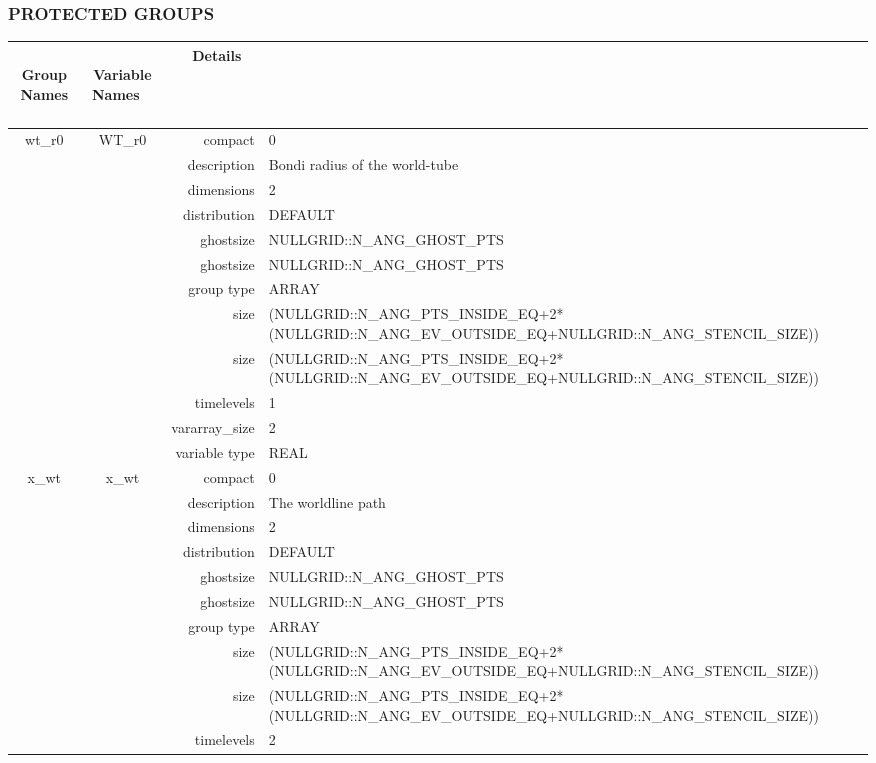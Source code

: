 \vspace{5mm}\subsubsection{PROTECTED GROUPS}

\vspace{5mm}

\begin{tabular*}{150mm}{|c|c@{\extracolsep{\fill}}|rl|} \hline 
~ {\bf Group Names} ~ & ~ {\bf Variable Names} ~  &{\bf Details} ~ & ~\\ 
\hline 
wt\_r0 & WT\_r0 & compact & 0 \\ 
 &  & description & Bondi radius of the world-tube \\ 
 &  & dimensions & 2 \\ 
 &  & distribution & DEFAULT \\ 
 &  & ghostsize & NULLGRID::N\_ANG\_GHOST\_PTS \\ 
& ~ & ghostsize & NULLGRID::N\_ANG\_GHOST\_PTS \\ 
 &  & group type & ARRAY \\ 
 &  & size & (NULLGRID::N\_ANG\_PTS\_INSIDE\_EQ+2*(NULLGRID::N\_ANG\_EV\_OUTSIDE\_EQ+NULLGRID::N\_ANG\_STENCIL\_SIZE)) \\ 
& ~ & size & (NULLGRID::N\_ANG\_PTS\_INSIDE\_EQ+2*(NULLGRID::N\_ANG\_EV\_OUTSIDE\_EQ+NULLGRID::N\_ANG\_STENCIL\_SIZE)) \\ 
 &  & timelevels & 1 \\ 
 &  & vararray\_size & 2 \\ 
 &  & variable type & REAL \\ 
\hline 
x\_wt & x\_wt & compact & 0 \\ 
 &  & description & The worldline path \\ 
 &  & dimensions & 2 \\ 
 &  & distribution & DEFAULT \\ 
 &  & ghostsize & NULLGRID::N\_ANG\_GHOST\_PTS \\ 
& ~ & ghostsize & NULLGRID::N\_ANG\_GHOST\_PTS \\ 
 &  & group type & ARRAY \\ 
 &  & size & (NULLGRID::N\_ANG\_PTS\_INSIDE\_EQ+2*(NULLGRID::N\_ANG\_EV\_OUTSIDE\_EQ+NULLGRID::N\_ANG\_STENCIL\_SIZE)) \\ 
& ~ & size & (NULLGRID::N\_ANG\_PTS\_INSIDE\_EQ+2*(NULLGRID::N\_ANG\_EV\_OUTSIDE\_EQ+NULLGRID::N\_ANG\_STENCIL\_SIZE)) \\ 
 &  & timelevels & 2 \\ 

\end{tabular*}
